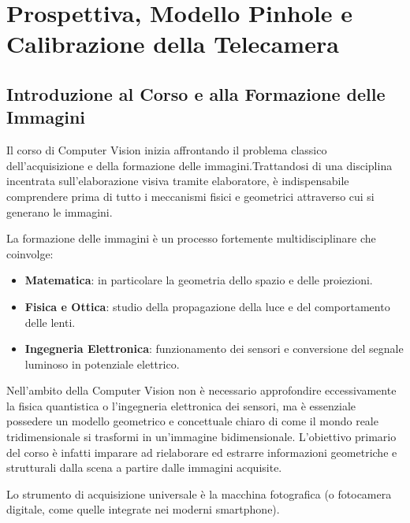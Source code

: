 \chapter{Prospettiva, Modello Pinhole e Calibrazione della Telecamera}

\section{Introduzione al Corso e alla Formazione delle Immagini}
Il corso di Computer Vision inizia affrontando il problema classico dell'acquisizione e della formazione delle immagini.Trattandosi di una disciplina incentrata sull'elaborazione visiva tramite elaboratore, è indispensabile comprendere prima di tutto i meccanismi fisici e geometrici attraverso cui si generano le immagini.

La formazione delle immagini è un processo fortemente multidisciplinare che coinvolge:
\begin{itemize}
    \item \textbf{Matematica}: in particolare la geometria dello spazio e delle proiezioni.
    \item \textbf{Fisica e Ottica}: studio della propagazione della luce e del comportamento delle lenti.
    \item \textbf{Ingegneria Elettronica}: funzionamento dei sensori e conversione del segnale luminoso in potenziale elettrico.
\end{itemize}

Nell'ambito della Computer Vision non è necessario approfondire eccessivamente la fisica quantistica o l'ingegneria elettronica dei sensori, ma è essenziale possedere un modello geometrico e concettuale chiaro di come il mondo reale tridimensionale si trasformi in un'immagine bidimensionale. L'obiettivo primario del corso è infatti imparare ad rielaborare ed estrarre informazioni geometriche e strutturali dalla scena a partire dalle immagini acquisite.

Lo strumento di acquisizione universale è la macchina fotografica (o fotocamera digitale, come quelle integrate nei moderni smartphone).

